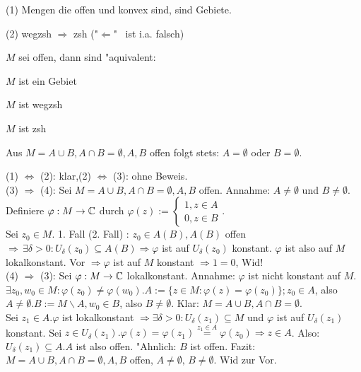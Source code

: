 \documentclass[a4paper,twoside,DIV15,BCOR12mm]{scrbook}
\begin{document}
\begin{bemerkung}
\item (1) Mengen die offen und konvex sind, sind Gebiete.
\item (2) wegzsh $\Rightarrow$ zsh ("$\Leftarrow$" \, ist i.a. falsch)
\end{bemerkung}

\begin{satz}
$M$ sei offen, dann sind "aquivalent:
\begin{liste}
\item $M$ ist ein Gebiet
\item $M$ ist wegzsh
\item $M$ ist zsh
\item Aus $M = A \cup B, A \cap B = \emptyset, A,B$ offen folgt stets: $A = \emptyset$ oder $B = \emptyset$.
\end{liste}
\end{satz}

\begin{beweis}
(1) $\Leftrightarrow$ (2): klar,(2) $\Leftrightarrow$ (3): ohne Beweis.\\
(3) $\Rightarrow$ (4): Sei $M = A \cup B, A \cap B = \emptyset, A,B$ offen. Annahme: $A \not= \emptyset$ und $B \not= \emptyset$. Definiere $\varphi: M \rightarrow \mathbb{C}$ durch $\varphi(z):= \begin{cases} 1, z\in A\\ 0, z\in B \end{cases}$.\\
Sei $z_0 \in M$. 1. Fall (2. Fall) : $z_0 \in A (B), A (B)$ offen $\Rightarrow \, \exists \delta >0: U_{\delta}(z_0) \subseteq A (B) \Rightarrow \varphi$ ist auf $U_{\delta}(z_0)$ konstant. $\varphi$ ist also auf $M$ lokalkonstant. Vor $\Rightarrow \varphi$ ist auf $M$ konstant $\Rightarrow 1=0$, Wid!\\
(4) $\Rightarrow$ (3): Sei $\varphi: M \rightarrow \mathbb{C}$ lokalkonstant. Annahme: $\varphi$ ist nicht konstant auf $M$. $\exists z_0, w_0 \in M: \varphi(z_0) \not= \varphi(w_0). A := \{ z \in M: \varphi(z) = \varphi(z_0) \}; z_0 \in A$, also $A \not= \emptyset. B:= M \backslash A, w_0 \in B$, also $B \not= \emptyset$. Klar: $M = A \cup B, A \cap B = \emptyset$.\\
Sei $z_1 \in A. \varphi$ ist lokalkonstant $\Rightarrow \exists \delta > 0: U_{\delta}(z_1) \subseteq M$ und $\varphi$ ist auf $U_{\delta}(z_1)$ konstant. Sei $z \in U_{\delta}(z_1). \varphi(z) = \varphi(z_1) \stackrel{z_1 \in A}{=} \varphi(z_0) \Rightarrow z \in A$. Also: $U_{\delta}(z_1) \subseteq A. A$ ist also offen. "Ahnlich: $B$ ist offen. Fazit: $M = A \cup B, A \cap B = \emptyset, A,B$ offen, $A \not= \emptyset, \, B \not= \emptyset$. Wid zur Vor.
\end{beweis}
\end{document}
